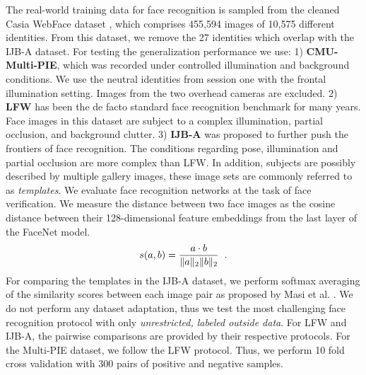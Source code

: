 \documentclass[10pt,twocolumn,letterpaper]{article}
\begin{document}
	The real-world training data for face recognition is sampled from the cleaned Casia WebFace dataset \cite{casia}, which comprises 455,594 images of 10,575 different identities. From this dataset, we remove the 27 identities which overlap with the IJB-A dataset. For testing the generalization performance we use: 1) \textbf{CMU-Multi-PIE}\cite{multipie}, which was recorded under controlled illumination and background conditions. We use the neutral identities from session one with the frontal illumination setting. Images from the two overhead cameras are excluded.  2) \textbf{LFW}\cite{lfw} has been the de facto standard face recognition benchmark for many years. Face images in this dataset are subject to a complex illumination, partial occlusion, and background clutter. 3) \textbf{IJB-A}\cite{ijba} was proposed to further push the frontiers of face recognition. The conditions regarding pose, illumination and partial occlusion are more complex than LFW. In addition, subjects are possibly described by multiple gallery images, these image sets are commonly referred to as \textit{templates}. 
	We evaluate face recognition networks at the task of face verification. We measure the distance between two face images as the cosine distance between their 128-dimensional feature embeddings from the last layer of the FaceNet model.
    \begin{equation}
           s(a,b)=\frac{a \cdot b}{\lVert a\rVert_2 \lVert b\rVert_2} \hspace{0.2cm}.
    \end{equation}%
    For comparing the templates in the IJB-A dataset, we perform softmax averaging of the similarity scores between each image pair as proposed by Masi et al. \cite{masi2016we}. We do not perform any dataset adaptation, thus we test the most challenging face recognition protocol with only \textit{unrestricted, labeled outside data}. For LFW and IJB-A, the pairwise comparisons are provided by their respective protocols. For the Multi-PIE dataset, we follow the LFW protocol. Thus, we perform 10 fold cross validation with 300 pairs of positive and negative samples.
    
	
\end{document}
